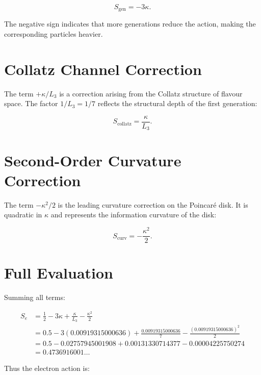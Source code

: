\begin{equation}
S_{\text{gen}} = -3\kappa.
\label{eq:gen_term}
\end{equation}

The negative sign indicates that more generations reduce the action, making
the corresponding particles heavier.

\section{Collatz Channel Correction}

The term \(+\kappa/L_3\) is a correction arising from the Collatz structure
of flavour space.  The factor \(1/L_3 = 1/7\) reflects the structural depth
of the first generation:

\begin{equation}
S_{\text{collatz}} = \frac{\kappa}{L_3}.
\label{eq:collatz_term}
\end{equation}

\section{Second-Order Curvature Correction}

The term \(-\kappa^2/2\) is the leading curvature correction on the
Poincar\'{e} disk.  It is quadratic in \(\kappa\) and represents the
information curvature of the disk:

\begin{equation}
S_{\text{curv}} = -\frac{\kappa^2}{2}.
\label{eq:curv_term}
\end{equation}

\section{Full Evaluation}

Summing all terms:

\[
\begin{aligned}
S_e &= \frac12 - 3\kappa + \frac{\kappa}{L_3} - \frac{\kappa^2}{2} \\[4pt]
    &= 0.5 - 3(0.00919315000636) + \frac{0.00919315000636}{7}
       - \frac{(0.00919315000636)^2}{2} \\[4pt]
    &= 0.5 - 0.02757945001908 + 0.00131330714377
       - 0.00004225750274 \\[4pt]
    &= 0.4736916001 \ldots
\end{aligned}
\]

Thus the electron action is:

